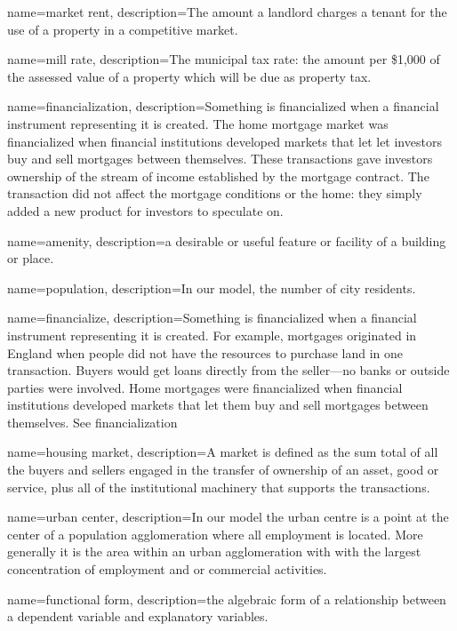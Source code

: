 {
name=market rent,
description={The amount a landlord charges a tenant for the use of a property in a competitive market. }
}

{
name=mill rate,
description={The municipal tax rate: the amount per \$1,000 of the assessed value of a property which will be due as property tax.}
}

{
name=financialization,
description={Something is financialized when a financial instrument representing it is created. The  home mortgage market was financialized when financial institutions developed markets that let let investors buy and sell mortgages between themselves. These transactions gave investors ownership of the stream of income established by the mortgage contract. The transaction did not affect the mortgage conditions or the home: they simply added a new product for investors to speculate on. }
}

{
name=amenity,
description={a desirable or useful feature or facility of a building or place.}
}

{
name=population,
description={In our model, the number of city residents. }
}

{
name=financialize,
description={Something is financialized when a financial instrument representing it is created. For example, mortgages originated in England when people did not have the resources to purchase land in one transaction. Buyers would get loans directly from the seller---no banks or outside parties were involved. Home mortgages were financialized when financial institutions developed markets that let them buy and sell mortgages between themselves.  See \gls{financialization}}
}

{
name=housing market,
description={A market is defined as the sum total of all the buyers and sellers engaged in the transfer of ownership of an asset, good or service, plus all of the institutional machinery that supports the transactions. }
}

{
name=urban center,
description={In our model the urban centre is a point at the center of a population agglomeration where all employment is located. More generally it is the area within an urban agglomeration with with the largest  concentration of employment and or commercial activities.} 
}

{
name=functional form,
description={the algebraic form of a relationship between a dependent variable and explanatory variables.}
}

